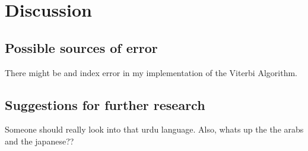 
\section{Discussion}

\subsection{Possible sources of error}

There might be and index error in my implementation of the Viterbi Algorithm.


\subsection{Suggestions for further research}

Someone should really look into that urdu language. Also, whats up the the arabs
and the japanese??


\pagebreak
